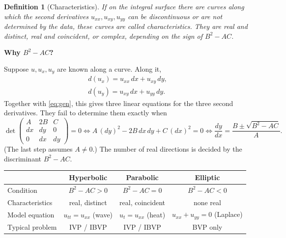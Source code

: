 \documentclass[11pt,a4paper]{article}
\numberwithin{equation}{section}
\theoremstyle{spacedplain}
\theoremstyle{spaceddefinition}
\newtheorem{definition}[theorem]{Definition}
\theoremstyle{spacedremark}
\newcommand{\step}[1]{\par\addvspace{0.6em}\noindent\textbf{#1}\par\nobreak}
\begin{document}
\begin{definition}[Characteristics]
If on the integral surface there are curves along which the second
derivatives \(u_{xx},u_{xy},u_{yy}\) can be discontinuous or are not
determined by the data, these curves are called
\emph{characteristics}.  They are real and distinct, real and
coincident, or complex, depending on the sign of \(B^2-AC\).
\end{definition}

\step{Why \(B^2-AC\)?}
Suppose \(u,u_x,u_y\) are known along a curve.
Along it,
\[
\begin{gathered}
  d(u_x)=u_{xx}\,dx+u_{xy}\,dy,
  \\
  d(u_y)=u_{xy}\,dx+u_{yy}\,dy.
\end{gathered}
\]
Together with \eqref{eq:gen}, this gives three linear equations for
the three second derivatives.  They fail to determine them exactly when
\[
  \det\begin{pmatrix}A&2B&C\\ dx&dy&0\\0&dx&dy\end{pmatrix}=0
  \iff A\,(dy)^2-2B\,dx\,dy+C\,(dx)^2=0
  \iff \frac{dy}{dx}=\frac{B\pm\sqrt{B^2-AC}}{A}.
\]
(The last step assumes \(A\ne0\).)  The number of real directions is
decided by the discriminant \(B^2-AC\).

\begin{center}
\renewcommand{\arraystretch}{1.3}
\begin{tabular}{@{}lccc@{}}
\toprule
 & \textbf{Hyperbolic} & \textbf{Parabolic} & \textbf{Elliptic}\\
\midrule
Condition & \(B^2-AC>0\) & \(B^2-AC=0\) & \(B^2-AC<0\)\\
Characteristics & real, distinct & real, coincident & none real\\
Model equation & \(u_{tt}=u_{xx}\) (wave) & \(u_t=u_{xx}\) (heat)
  & \(u_{xx}+u_{yy}=0\) (Laplace)\\
Typical problem & IVP / IBVP & IVP / IBVP & BVP only\\
\bottomrule
\end{tabular}
\end{center}
\end{document}
